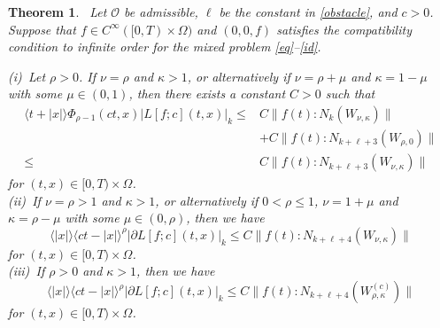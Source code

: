 \documentclass[12pt]{amsart}
\newcommand{\jb}[1]{\left\langle #1 \right\rangle}
\newcommand{\norm}[2]{\|#1 \!:\! #2\|}
\newtheorem{theorem}{Theorem}[section]
\numberwithin{equation}{section}
\begin{document}
\begin{theorem}\ \label{main3}
Let ${\mathcal O}$ be admissible, 
$\ell$ be the constant in \eqref{obstacle},
and $c>0$.
Suppose that
$f \in C^\infty([0,T)\times \Omega)$ and $(0,0,f)$ satisfies the compatibility
condition to infinite order for the mixed problem \eqref{eq}--\eqref{id}.

\noindent 
{\rm (i)}\ Let $\rho>0$. If $\nu=\rho$ and $\kappa>1$, 
or alternatively if $\nu=\rho+\mu$ and $\kappa=1-\mu$
with some $\mu\in (0,1)$,
then there exists a constant $C>0$ such that
\begin{align}\label{ba3}
 \langle t+|x| \rangle {\Phi}_{\rho-1}(ct,x) |L[f; c](t,x)|_k
 \le & C 
 \|f(t)\!:\!{N_{k}(W_{\nu,\kappa})}\|\\
 &+C\norm{f(t)}{N_{k+\ell+3}(W_{\rho, 0})} \nonumber\\
 \le & C 
 \|f(t)\!:\!{N_{k+\ell+3}(W_{\nu,\kappa})}\|
 \nonumber
\end{align}
for $(t,x)\in [0,T)\times \Omega$.
\smallskip\\
{\rm (ii)}\ If $\nu=\rho>1$ and $\kappa>1$, or alternatively
if $0<\rho\le 1$, $\nu=1+\mu$ and $\kappa=\rho-\mu$
with some $\mu\in (0, \rho)$, then we have
\begin{equation}\label{ba4}
 \langle |x| \rangle \langle ct -|x| \rangle^{\rho} |\partial L[f; c](t,x)|_k
 \le C
\|f(t)\!:\!{N_{k+\ell+4}(W_{\nu,\kappa})}\|
\end{equation}
for $(t,x)\in [0,T)\times \Omega$.
\smallskip\\
{\rm (iii)}\ If $\rho>0$ and $\kappa>1$, then we have
\begin{equation}\label{DS}
 \langle |x| \rangle \langle ct -|x| \rangle^{\rho} |\partial L[f; c](t,x)|_k
 \le C
\|f(t)\!:\!{N_{k+\ell+4}(W_{\rho,\kappa}^{(c)})}\|
\end{equation}
for $(t,x)\in [0,T)\times \Omega$.
\end{theorem}
\end{document}
